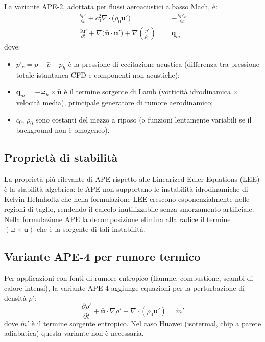 \documentclass[11pt,a4paper]{article}
\begin{document}
La variante APE-2, adottata per flussi aeroacustici a basso Mach, è:
\begin{align}
  \frac{\partial p'}{\partial t} + c_0^2 \nabla \cdot \bigl(\rho_0 \mathbf{u}'\bigr)
    &= -\frac{\partial p'_e}{\partial t} \label{eq:ape2_p} \\[6pt]
  \frac{\partial \mathbf{u}'}{\partial t} + \nabla\bigl(\mathbf{\bar{u}} \cdot \mathbf{u}'\bigr)
    + \nabla\!\left(\frac{p'}{\rho_0}\right)
    &= \mathbf{q}_m \label{eq:ape2_u}
\end{align}
dove:
\begin{itemize}
  \item $p'_e = p - \bar{p} - p_h$ è la pressione di eccitazione acustica
        (differenza tra pressione totale istantanea CFD e componenti non acustiche);
  \item $\mathbf{q}_m = -\boldsymbol{\omega}_h \times \mathbf{\bar{u}}$
        è il termine sorgente di Lamb (vorticità idrodinamica $\times$ velocità media),
        principale generatore di rumore aerodinamico;
  \item $c_0$, $\rho_0$ sono costanti del mezzo a riposo (o funzioni lentamente
        variabili se il background non è omogeneo).
\end{itemize}

\subsection{Proprietà di stabilità}

La proprietà più rilevante di APE rispetto alle Linearized Euler Equations
(LEE) è la stabilità algebrica: le APE non supportano le instabilità
idrodinamiche di Kelvin-Helmholtz che nella formulazione LEE crescono
esponenzialmente nelle regioni di taglio, rendendo il calcolo inutilizzabile
senza smorzamento artificiale.
Nella formulazione APE la decomposizione elimina alla radice il termine
$(\boldsymbol{\omega} \times \mathbf{u})$ che è la sorgente di tali instabilità.

\subsection{Variante APE-4 per rumore termico}

Per applicazioni con fonti di rumore entropico (fiamme, combustione,
scambi di calore intensi), la variante APE-4 \cite{bui2007} aggiunge
equazioni per la perturbazione di densità $\rho'$:
\[
  \frac{\partial \rho'}{\partial t} + \mathbf{\bar{u}} \cdot \nabla\rho'
  + \nabla \cdot (\rho_0 \mathbf{u}') = \dot{m}'
\]
dove $\dot{m}'$ è il termine sorgente entropico.
Nel caso Huawei (isotermal, chip a parete adiabatica) questa variante non
è necessaria.
\end{document}

